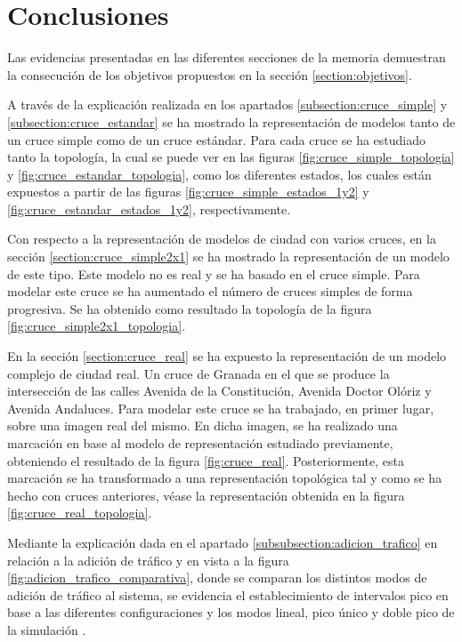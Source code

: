 \chapter{Conclusiones}
    \label{chap:eight}
Las evidencias presentadas en las diferentes secciones de la memoria demuestran la consecución de los objetivos propuestos en la sección \ref{section:objetivos}.

A través de la explicación realizada en los apartados \ref{subsection:cruce_simple} y \ref{subsection:cruce_estandar} se ha mostrado la representación de modelos tanto de un cruce simple como de un cruce estándar. Para cada cruce se ha estudiado tanto la topología, la cual se puede ver en las figuras \ref{fig:cruce_simple_topologia} y \ref{fig:cruce_estandar_topologia}, como los diferentes estados, los cuales están expuestos a partir de las figuras \ref{fig:cruce_simple_estados_1y2} y \ref{fig:cruce_estandar_estados_1y2}, respectivamente.

Con respecto a la representación de modelos de ciudad con varios cruces, en la sección \ref{section:cruce_simple2x1} se ha mostrado la representación de un modelo de este tipo. Este modelo no es real y se ha basado en el cruce simple. Para modelar este cruce se ha aumentado el número de cruces simples de forma progresiva. Se ha obtenido como resultado la topología de la figura \ref{fig:cruce_simple2x1_topologia}.

En la sección \ref{section:cruce_real} se ha expuesto la representación de un modelo complejo de ciudad real. Un cruce de Granada en el que se produce la intersección de las calles Avenida de la Constitución, Avenida Doctor Olóriz y Avenida Andaluces. Para modelar este cruce se ha trabajado, en primer lugar, sobre una imagen real del mismo. En dicha imagen, se ha realizado una marcación en base al modelo de representación estudiado previamente, obteniendo el resultado de la figura \ref{fig:cruce_real}. Posteriormente, esta marcación se ha transformado a una representación topológica tal y como se ha hecho con cruces anteriores, véase la representación obtenida en la figura \ref{fig:cruce_real_topologia}.

Mediante la explicación dada en el apartado \ref{subsubsection:adicion_trafico} en relación a la adición de tráfico y en vista a la figura \ref{fig:adicion_trafico_comparativa}, donde se comparan los distintos modos de adición de tráfico al sistema, se evidencia el establecimiento de intervalos pico en base a las diferentes configuraciones y los modos lineal, pico único y doble pico de la simulación .

